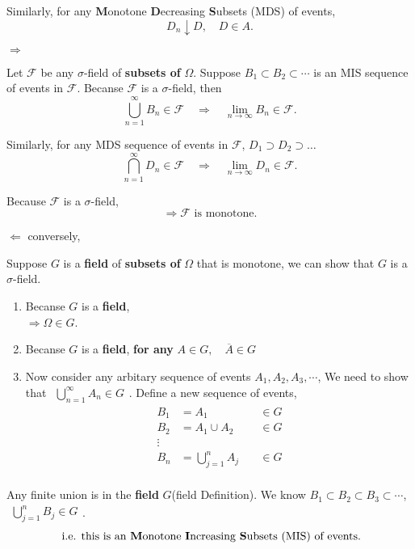\documentclass[12pt,thmsa]{article}
\begin{document}
Similarly, for any \textbf{M}onotone \textbf{D}ecreasing \textbf{S}ubsets (MDS) of events,
\[
D_{n} \downarrow D, \quad D \in A.
\]

\(\Longrightarrow\)

Let \(\mathcal{F}\) be any \(\sigma\)-field of \textbf{subsets of} \(\Omega\). Suppose \(B_{1} \subset B_{2} \subset \cdots\) is an MIS sequence of events in \(\mathcal{F}\). Becanse \(\mathcal{F}\) is a \(\sigma\)-field, then
\[
\bigcup_{n=1}^{\infty} B_{n} \in \mathcal{F} \quad \Rightarrow \quad \lim _{n \rightarrow \infty} B_{n} \in \mathcal{F}.
\]

Similarly, for any MDS sequence of events in \(\mathcal{F}\), \(D_{1} \supset D_{2} \supset \dots\)
\[
\bigcap_{n=1}^{\infty} D_{n} \in \mathcal{F} \quad \Rightarrow \quad \lim _{n \rightarrow \infty} D_{n} \in \mathcal{F}.
\]

Because \(\mathcal{F}\) is a \(\sigma\)-field,
\[\Rightarrow \mathcal{F} \text{ is monotone.}\]

\(\Longleftarrow\) conversely,

Suppose \(G\) is a \textbf{field} of \textbf{subsets of} \(\Omega\) that
is monotone, we can show that \(G\) is a \(\sigma\)-field.

\begin{enumerate}[label=\roman*)] %
	\item Becanse \(G\) is a \textbf{field}, \\
	\(\Rightarrow \Omega \in G\).
	
	\item Becanse \(G\) is a \textbf{field}, \textbf{for any} \(A \in G, \quad \overline{A} \in G\)
	
	\item Now consider any arbitary sequence of events \(A_{1}, A_{2}, A_{3}, \cdots\), We need to show that \(\begin{aligned}\bigcup_{n=1}^{\infty} A_{n} \in G\end{aligned}\). Define a new sequence of events,
	\[
	\begin{aligned}
		B_{1} &=A_{1} \quad &\in G \\
		B_{2} &=A_{1} \cup A_{2} \quad &\in G \\
		\vdots & & \\
		B_{n} &= \bigcup_{j=1}^{n} A_{j} \quad &\in G \\
	\end{aligned}
	\]
\end{enumerate}

Any finite union is in the \textbf{field} \(G\)(field Definition). We know \(B_{1} \subset B_{2} \subset B_{3} \subset \cdots\), \(\begin{aligned}\bigcup_{j=1}^{n} B_{j} \in G \end{aligned}\).
\[
\text { i.e. this is an \textbf{M}onotone \textbf{I}ncreasing \textbf{S}ubsets (MIS) of events.}
\]
\end{document}
